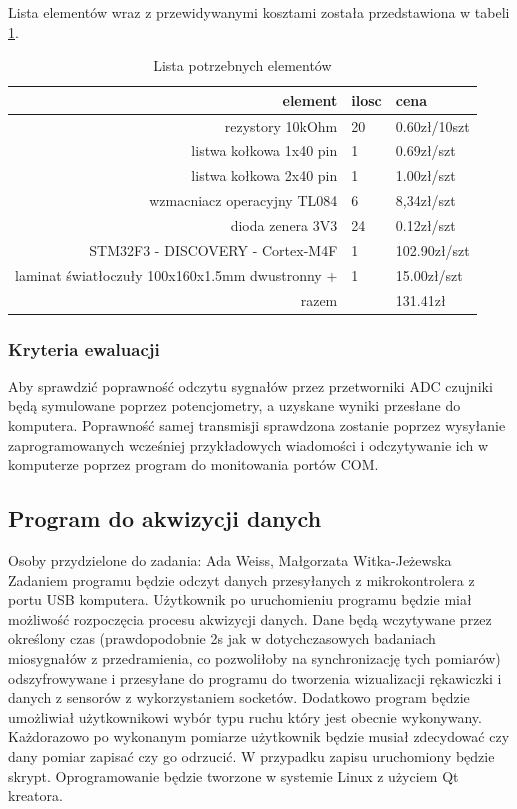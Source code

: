 \documentclass{article}
\begin{document}
Lista elementów wraz z przewidywanymi kosztami została przedstawiona w tabeli \ref{tab:interfejs}.
\begin{table}[h!]
\centering
\caption{ Lista potrzebnych elementów}

\begin{tabular}{|r|l|l|} \hline

element & ilosc & cena\\ \hline
rezystory 10kOhm & 20 & 0.60zł/10szt \\
listwa kołkowa 1x40 pin & 1 & 0.69zł/szt \\
listwa kołkowa 2x40 pin & 1 & 1.00zł/szt \\
wzmacniacz operacyjny TL084 & 6 & 8,34zł/szt \\
dioda zenera 3V3 & 24 & 0.12zł/szt \\
STM32F3 - DISCOVERY - Cortex-M4F & 1 & 102.90zł/szt \\
laminat światłoczuły 100x160x1.5mm dwustronny + & 1 & 15.00zł/szt \\\hline %
razem & & 131.41zł \\\hline
\end{tabular}
\label{tab:interfejs}
\end{table}


\subsubsection{Kryteria ewaluacji}
Aby sprawdzić poprawność odczytu sygnałów przez przetworniki ADC czujniki będą symulowane poprzez potencjometry, a uzyskane wyniki przesłane do komputera. Poprawność samej transmisji sprawdzona zostanie poprzez wysyłanie zaprogramowanych wcześniej przykładowych wiadomości i odczytywanie ich w komputerze poprzez program do monitowania portów COM.

\subsection{Program do akwizycji danych}
Osoby przydzielone do zadania: Ada Weiss, Małgorzata Witka-Jeżewska\\
Zadaniem programu będzie odczyt danych przesyłanych z mikrokontrolera z portu USB komputera. Użytkownik po uruchomieniu programu będzie miał możliwość rozpoczęcia procesu akwizycji danych. Dane będą wczytywane przez określony czas (prawdopodobnie 2s jak w dotychczasowych badaniach miosygnałów z przedramienia, co pozwoliłoby na synchronizację tych pomiarów) odszyfrowywane i przesyłane do programu do tworzenia wizualizacji rękawiczki i danych z sensorów z wykorzystaniem socketów. Dodatkowo program będzie umożliwiał użytkownikowi wybór typu ruchu który jest obecnie wykonywany. Każdorazowo po wykonanym pomiarze użytkownik będzie musiał zdecydować czy dany pomiar zapisać czy go odrzucić. W przypadku zapisu uruchomiony będzie skrypt. Oprogramowanie będzie tworzone w systemie Linux z użyciem Qt kreatora.
\end{document}
